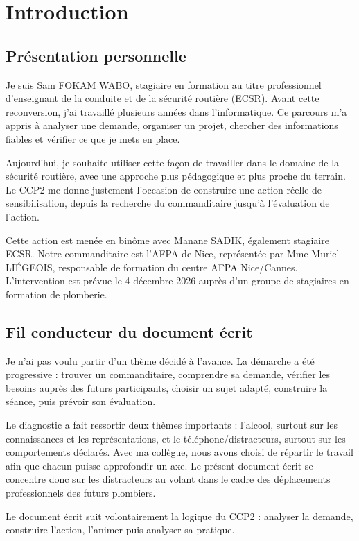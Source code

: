 \chapter{Introduction}
\section{Présentation personnelle}

Je suis Sam FOKAM WABO, stagiaire en formation au titre professionnel d’enseignant de la conduite et de la sécurité routière (ECSR). Avant cette reconversion, j’ai travaillé plusieurs années dans l’informatique. Ce parcours m’a appris à analyser une demande, organiser un projet, chercher des informations fiables et vérifier ce que je mets en place.

Aujourd’hui, je souhaite utiliser cette façon de travailler dans le domaine de la sécurité routière, avec une approche plus pédagogique et plus proche du terrain. Le CCP2 me donne justement l’occasion de construire une action réelle de sensibilisation, depuis la recherche du commanditaire jusqu’à l’évaluation de l’action.

Cette action est menée en binôme avec Manane SADIK, également stagiaire ECSR. Notre commanditaire est l’AFPA de Nice, représentée par Mme Muriel LIÉGEOIS, responsable de formation du centre AFPA Nice/Cannes. L’intervention est prévue le 4 décembre 2026 auprès d’un groupe de stagiaires en formation de plomberie.

\section{Fil conducteur du document écrit}

Je n’ai pas voulu partir d’un thème décidé à l’avance. La démarche a été progressive : trouver un commanditaire, comprendre sa demande, vérifier les besoins auprès des futurs participants, choisir un sujet adapté, construire la séance, puis prévoir son évaluation.

Le diagnostic a fait ressortir deux thèmes importants : l’alcool, surtout sur les connaissances et les représentations, et le téléphone/distracteurs, surtout sur les comportements déclarés. Avec ma collègue, nous avons choisi de répartir le travail afin que chacun puisse approfondir un axe. Le présent document écrit se concentre donc sur les distracteurs au volant dans le cadre des déplacements professionnels des futurs plombiers.

Le document écrit suit volontairement la logique du CCP2 : analyser la demande, construire l’action, l’animer puis analyser sa pratique.

